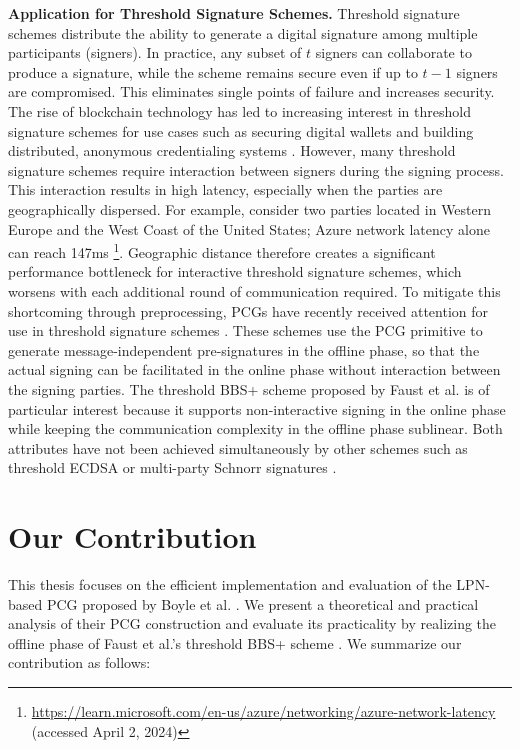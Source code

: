 \textbf{Application for Threshold Signature Schemes.}  Threshold signature schemes \cite{desmedt1987society, desmedt1992threshold} distribute the ability to generate a digital signature among multiple participants (signers). In practice, any subset of $t$ signers can collaborate to produce a signature, while the scheme remains secure even if up to $t - 1$ signers are compromised. This eliminates single points of failure and increases security. The rise of blockchain technology has led to increasing interest in threshold signature schemes for use cases such as securing digital wallets \cite{gennaro2016threshold} and building distributed, anonymous credentialing systems \cite{garman2013decentralized}. However, many threshold signature schemes require interaction between signers during the signing process. This interaction results in high latency, especially when the parties are geographically dispersed. For example, consider two parties located in Western Europe and the West Coast of the United States; Azure network latency alone can reach 147ms \footnote{\url{https://learn.microsoft.com/en-us/azure/networking/azure-network-latency} (accessed April 2, 2024)}. Geographic distance therefore creates a significant performance bottleneck for interactive threshold signature schemes, which worsens with each additional round of communication required. To mitigate this shortcoming through preprocessing, PCGs have recently received attention for use in threshold signature schemes \cite{abram2022low, cryptoeprint:2023/1076}. These schemes use the PCG primitive to generate message-independent pre-signatures in the offline phase, so that the actual signing can be facilitated in the online phase without interaction between the signing parties. The threshold BBS+ scheme proposed by Faust et al. \cite{cryptoeprint:2023/1076} is of particular interest because it supports non-interactive signing in the online phase while keeping the communication complexity in the offline phase sublinear. Both attributes have not been achieved simultaneously by other schemes such as threshold ECDSA \cite{abram2022low} or multi-party Schnorr signatures \cite{kondi2023two}. 

\section{Our Contribution}
This thesis focuses on the efficient implementation and evaluation of the LPN-based PCG proposed by Boyle et al. \cite{boyle2020efficient}. We present a theoretical and practical analysis of their PCG construction and evaluate its practicality by realizing the offline phase of Faust et al.'s threshold BBS+ scheme \cite{cryptoeprint:2023/1076}. We summarize our contribution as follows:

